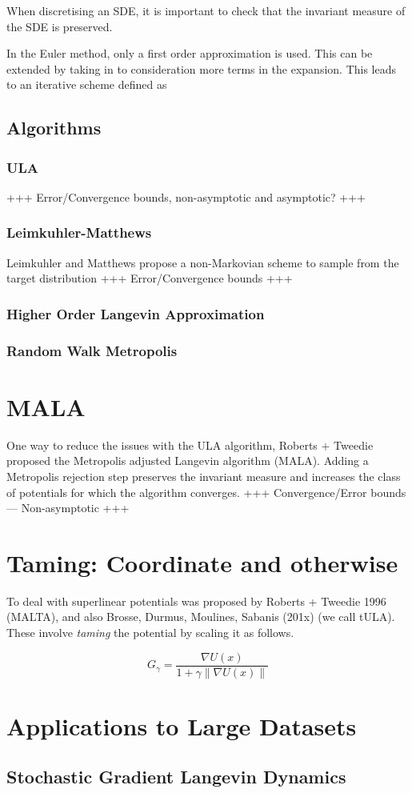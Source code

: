\documentclass[a4paper]{article}
\theoremstyle{definition}
\begin{document}
		When discretising an SDE, it is important to check that the invariant measure of the SDE is preserved. 
		
		In the Euler method, only a first order approximation is used. This can be extended by taking in to consideration more terms in the expansion. This leads to an iterative scheme defined as
		\subsection{Algorithms}
		\subsubsection{ULA}
		+++ Error/Convergence bounds, non-asymptotic and asymptotic? +++
		\subsubsection{Leimkuhler-Matthews}
		Leimkuhler and Matthews propose a non-Markovian scheme to sample from the target distribution
			+++ Error/Convergence bounds +++
		\subsubsection{Higher Order Langevin Approximation}
		\subsubsection{Random Walk Metropolis}
		

	\section{MALA}
	\cite{RT_MALA}
	One way to reduce the issues with the ULA algorithm, Roberts + Tweedie proposed the Metropolis adjusted Langevin algorithm (MALA). Adding a Metropolis rejection step preserves the invariant measure and increases the class of potentials for which the algorithm converges.
	+++ Convergence/Error bounds --- Non-asymptotic +++ 
	
	\section{Taming: Coordinate and otherwise}
	
	To deal with superlinear potentials was proposed by Roberts + Tweedie 1996 (MALTA), and also Brosse, Durmus, Moulines, Sabanis (201x) (we call tULA). These involve \emph{taming} the potential by scaling it as follows.
	
	\[G_{\gamma} = \frac{\nabla U(x)}{1+\gamma \|\nabla U(x)\|}\]
	
	
	 
	
	\section{Applications to Large Datasets}
		\subsection{Stochastic Gradient Langevin Dynamics}
		
		
		
		
\end{document}
